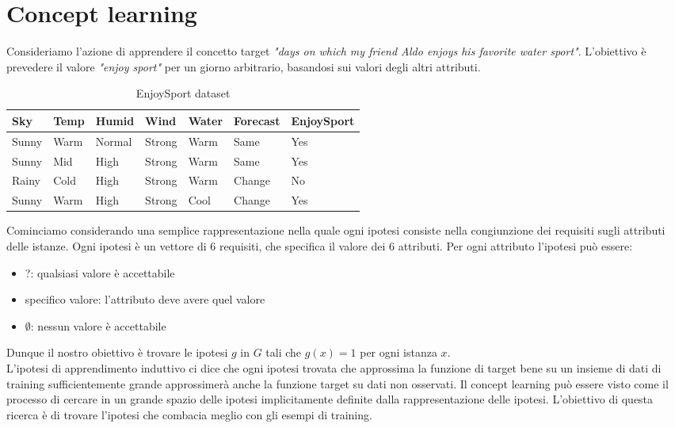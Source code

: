 \documentclass{../main.tex}[subfiles]
\begin{document}
\section{Concept learning}
Consideriamo l'azione di apprendere il concetto target \textit{"days on which my friend Aldo enjoys his favorite water sport"}.
L'obiettivo è prevedere il valore \textit{"enjoy sport"} per un giorno arbitrario, basandosi sui valori degli altri attributi.
\begin{table}[H]
\centering
\begin{tabular}{lllllll}
\toprule
\textbf{Sky} & \textbf{Temp} & \textbf{Humid} & \textbf{Wind} & \textbf{Water} & \textbf{Forecast} & \textbf{EnjoySport} \\
\midrule
Sunny & Warm & Normal & Strong & Warm & Same & Yes \\
Sunny & Mid & High & Strong & Warm & Same & Yes \\
Rainy & Cold & High & Strong & Warm & Change & No \\
Sunny & Warm & High & Strong & Cool & Change & Yes \\
\bottomrule
\end{tabular}
\caption{EnjoySport dataset}
\label{tab:enjoysport}
\end{table} \noindent
Cominciamo considerando una semplice rappresentazione nella quale ogni ipotesi consiste nella congiunzione dei requisiti sugli attributi delle istanze.
Ogni ipotesi è un vettore di 6 requisiti, che specifica il valore dei 6 attributi.
Per ogni attributo l'ipotesi può essere:
\begin{itemize}
	\item ?: qualsiasi valore è accettabile
	\item specifico valore: l'attributo deve avere quel valore
	\item $\emptyset$: nessun valore è accettabile
\end{itemize}
Dunque il nostro obiettivo è trovare le ipotesi $g$ in $G$ tali che $g(x) = 1$ per ogni istanza $x$.\\
L'ipotesi di apprendimento induttivo ci dice che ogni ipotesi trovata che approssima la funzione di target bene su un insieme di dati di training sufficientemente grande approssimerà anche la funzione target su dati non osservati.
Il concept learning può essere visto come il processo di cercare in un grande spazio delle ipotesi implicitamente definite dalla rappresentazione delle ipotesi.
L'obiettivo di questa ricerca è di trovare l'ipotesi che combacia meglio con gli esempi di training.
\end{document}
